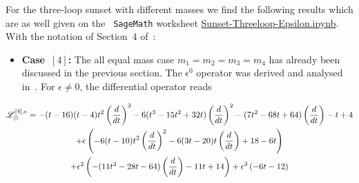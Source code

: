 \documentclass[a4paper,12pt]{article}
\numberwithin{equation}{section}
\numberwithin{figure}{section}
\def\su{\circleddash}
\begin{document}
For the three-loop sunset with different masses we find the following
results which are as well given on the  {\tt
  SageMath} worksheet \href{Sunset-Threeloop-Epsilon.ipynb}{Sunset-Threeloop-Epsilon.ipynb}. With the notation of Section~4 of~\cite{Lairez:2022zkj}:
%
\begin{itemize}
\item  {\bf Case~$[4]$:} The all equal mass case $m_1=m_2=m_3=m_4$ has already been
  discussed in the previous section. The $\epsilon^0$ operator was derived and analysed in~\cite{Vanhove:2014wqa,Bloch:2014qca,Pogel:2022yat}. For $ \epsilon \ne 0$, the differential operator reads
   \end{itemize}
  \begin{multline}
    \mathscr{L}_\su^{[4],\epsilon}=
    -(t - 16)  (t - 4)  t^2\left(d\over dt\right)^3 - 6  (t^3 -
                              15  t^2 + 32  t)  \left(d\over dt\right)^2 - (7  t^2 - 68  t +
                              64)  \left(d\over dt\right) - t + 4\cr
                              +\epsilon \left(-6  (t - 10  ) t^2 \left(d\over dt\right)^2 -
      6  (3  t - 20  ) t \left(d\over dt\right) +18- 6  t 
      \right)\cr
    +\epsilon^2\left(-(11  t^2 -
      28  t - 64)  \left(d\over dt\right) - 11  t + 14\right)+ \epsilon^3\left(-6  t - 12\right)
  \end{multline}
\end{document}
